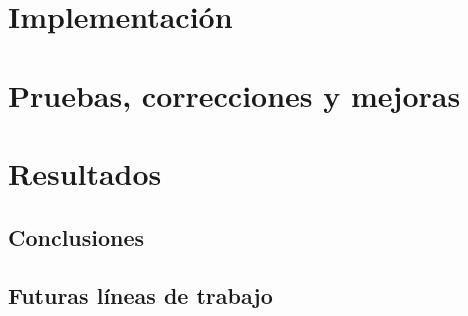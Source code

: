 \chapter{Implementación}

\cleardoublepage



\chapter{Pruebas, correcciones y mejoras}

\cleardoublepage



\chapter{Resultados}

    \section{Conclusiones}


    \section{Futuras líneas de trabajo}


\cleardoublepage
